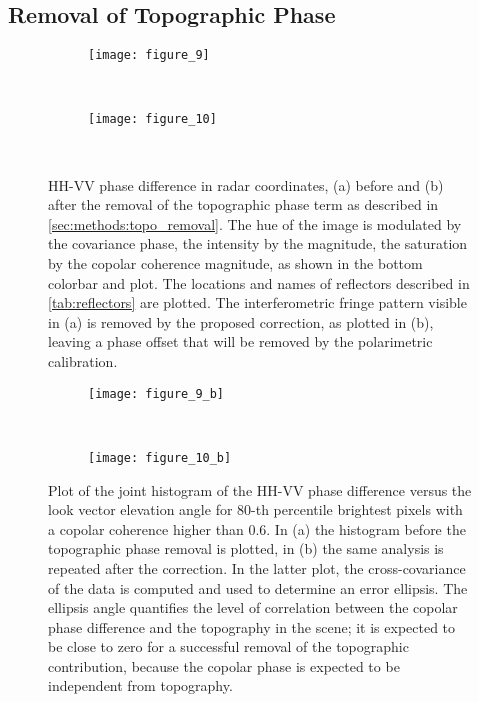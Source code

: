 \subsection{Removal of Topographic Phase}\label{sec:results:topo_removal}
\begin{figure*}[ht!]
	\centering
	\begin{subfigure}[t]{\textwidth}
	\centering
	\texttt{[image: figure\_9]}
	\label{fig:topo_phase:uncorrected}
	\end{subfigure}\\
	\begin{subfigure}[t]{\textwidth}
	\centering
	\texttt{[image: figure\_10]}
	\label{fig:topo_phase:corrected}
	\end{subfigure}\\
	\caption{HH-VV phase difference in radar coordinates, (a) before and (b)  after the removal of the topographic phase term as described in \autoref{sec:methods:topo_removal}. The hue of the image is modulated by the covariance phase, the intensity by the magnitude, the saturation by the copolar coherence magnitude, as shown in the bottom colorbar and plot. The locations and names of reflectors described in \autoref{tab:reflectors} are plotted. The interferometric fringe pattern visible in (a) is removed by the proposed correction, as plotted in (b), leaving a phase offset that will be removed by the polarimetric calibration.}
	\label{fig:topo_phase}
\end{figure*}
\begin{figure}[Ht!]	
	\centering
	\begin{subfigure}[t]{\columnwidth}
	\centering
	\texttt{[image: figure\_9\_b]}
	\label{fig:topo_correlation:uncorrected}
	\end{subfigure}\\
	\begin{subfigure}[t]{\columnwidth}
	\centering
	\texttt{[image: figure\_10\_b]}
	\label{fig:topo_correlation:corrected}
	\end{subfigure}
	\label{fig:topo_correlation}
	\caption{Plot of the joint histogram of the HH-VV phase difference versus the look vector elevation angle for  80-th percentile brightest pixels with a copolar coherence higher than 0.6. In (a) the histogram before the topographic phase removal is plotted, in (b) the same analysis is repeated after the correction. In the latter plot, the cross-covariance of the data is computed and used to determine an error ellipsis. The ellipsis angle quantifies the level of correlation between the copolar phase difference and the topography in the scene; it is expected to be close to zero for a successful removal of the topographic contribution, because the copolar phase is expected to be independent from topography.}

\end{figure}

